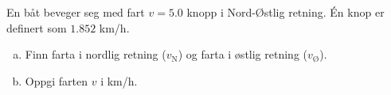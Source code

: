 %
En båt beveger seg med fart $v=5.0$ knopp i Nord-Østlig retning. Én knop er definert som $1.852$ km/h.
\begin{enumerate}[a)]
    \item Finn farta i nordlig retning ($v_\text{N}$) og farta i østlig retning ($v_\text{Ø}$).
    \item Oppgi farten $v$ i km/h. 
\end{enumerate}

